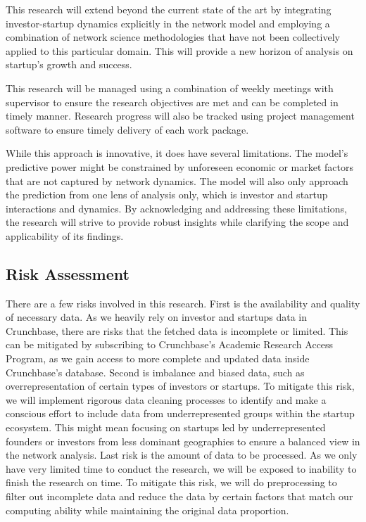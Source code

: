 \documentclass[a4paper,11pt]{article}
\begin{document}
This research will extend beyond the current state of the art by integrating investor-startup dynamics explicitly in the network model and employing a combination of network science methodologies that have not been collectively applied to this particular domain. This will provide a new horizon of analysis on startup's growth and success.

This research will be managed using a combination of weekly meetings with supervisor to ensure the research objectives are met and can be completed in timely manner. Research progress will also be tracked using project management software to ensure timely delivery of each work package.

While this approach is innovative, it does have several limitations.
The model’s predictive power might be constrained by unforeseen economic or market factors that are not captured by network dynamics. The model will also only approach the prediction from one lens of analysis only, which is investor and startup interactions and dynamics. By acknowledging and addressing these limitations, the research will strive to provide robust insights while clarifying the scope and applicability of its findings.

\subsection{Risk Assessment}
There are a few risks involved in this research. First is the availability and quality of necessary data. As we heavily rely on investor and startups data in Crunchbase, there are risks that the fetched data is incomplete or limited. This can be mitigated by subscribing to Crunchbase's Academic Research Access Program, as we gain access to more complete and updated data inside Crunchbase's database. Second is imbalance and biased data, such as overrepresentation of certain types of investors or startups. To mitigate this risk, we will implement rigorous data cleaning processes to identify and make a conscious effort to include data from underrepresented groups within the startup ecosystem. This might mean focusing on startups led by underrepresented founders or investors from less dominant geographies to ensure a balanced view in the network analysis. Last risk is the amount of data to be processed. As we only have very limited time to conduct the research, we will be exposed to inability to finish the research on time. To mitigate this risk, we will do preprocessing to filter out incomplete data and reduce the data by certain factors that match our computing ability while maintaining the original data proportion.
\end{document}
